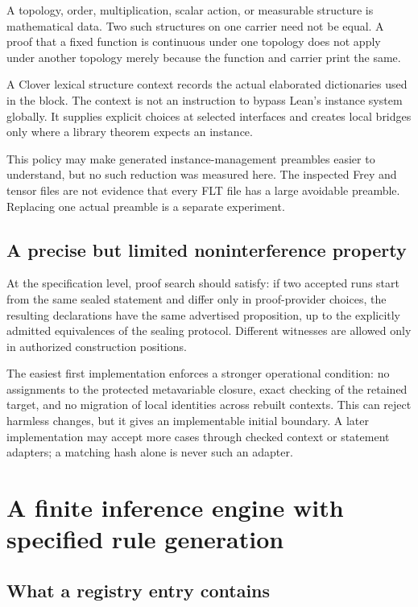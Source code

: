 \documentclass[11pt,a4paper]{article}
\theoremstyle{definition}
\theoremstyle{remark}
\begin{document}
A topology, order, multiplication, scalar action, or measurable structure is
mathematical data. Two such structures on one carrier need not be equal. A
proof that a fixed function is continuous under one topology does not apply
under another topology merely because the function and carrier print the same.

A Clover lexical structure context records the actual elaborated dictionaries
used in the block. The context is not an instruction to bypass Lean's instance
system globally. It supplies explicit choices at selected interfaces and
creates local bridges only where a library theorem expects an instance.

This policy may make generated instance-management preambles easier to
understand, but no such reduction was measured here. The inspected Frey and
tensor files are not evidence that every FLT file has a large avoidable
preamble. Replacing one actual preamble is a separate experiment.

\subsection{A precise but limited noninterference property}

At the specification level, proof search should satisfy: if two accepted runs
start from the same sealed statement and differ only in proof-provider choices,
the resulting declarations have the same advertised proposition, up to the
explicitly admitted equivalences of the sealing protocol. Different witnesses
are allowed only in authorized construction positions.

The easiest first implementation enforces a stronger operational condition:
no assignments to the protected metavariable closure, exact checking of the
retained target, and no migration of local identities across rebuilt contexts.
This can reject harmless changes, but it gives an implementable initial
boundary. A later implementation may accept more cases through checked context
or statement adapters; a matching hash alone is never such an adapter.

\section{A finite inference engine with specified rule generation}\label{sec:grounding}

\subsection{What a registry entry contains}
\end{document}
